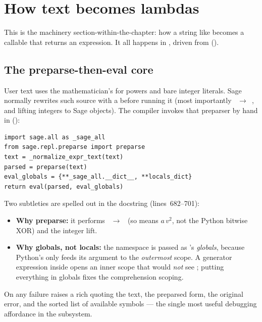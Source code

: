 \section{How text becomes lambdas}\label{sec:textcompile}

This is the machinery section-within-the-chapter: how a string like
 becomes a callable that returns an
 expression. It all happens in , driven
from  ().

\subsection{The preparse-then-eval core}

User text uses the mathematician's \code{\^{}} for powers and bare integer
literals. Sage normally rewrites such source with a  before
running it (most importantly \code{\^{}}~$\to$~\code{**}, and lifting integers to
Sage  objects). The compiler invokes that preparser by hand in
 ():

\begin{lstlisting}
import sage.all as _sage_all
from sage.repl.preparse import preparse
text = _normalize_expr_text(text)
parsed = preparse(text)
eval_globals = {**_sage_all.__dict__, **locals_dict}
return eval(parsed, eval_globals)
\end{lstlisting}

Two subtleties are spelled out in the docstring (lines~682--701):

\begin{itemize}
  \item \textbf{Why preparse:} it performs \code{\^{}}~$\to$~\code{**} (so
         means $a\,v^{2}$, not the Python bitwise XOR) and the
        integer lift.
  \item \textbf{Why globals, not locals:} the namespace is passed as 's
        \emph{globals}, because Python's  only feeds its 
        argument to the \emph{outermost} scope. A generator expression inside
         opens an inner scope that would \emph{not}
        see ; putting everything in globals fixes the comprehension
        scoping.
\end{itemize}

On any failure  raises a rich  quoting the
text, the preparsed form, the original error, and the sorted list of available
symbols --- the single most useful debugging affordance in the subsystem.

